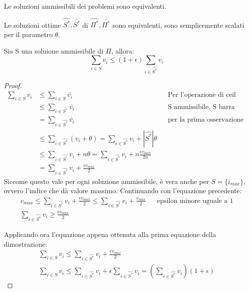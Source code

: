 \begin{remark}
    Le soluzioni ammissibili dei problemi sono equivalenti.
\end{remark}

\begin{lemma}
    Le soluzioni ottime $\hat{S^*}, \bar{S^*}$ di $\hat{\Pi^*}, \bar{\Pi^*}$ sono equivalenti, 
    sono semplicemente scalati per il parametro $\theta$.
\end{lemma}

\begin{lemma}
    \label{knl2}
    Sia S una soluione ammissibile di $\Pi$, allora:
    $$\sum_{i \in S} v_i \leq (1 + \epsilon) \sum_{i \in \hat{S^*}} v_i$$
\end{lemma}
\begin{proof}
    \begin{equation}
        \begin{aligned}
            \sum_{i \in S} v_i &\leq \sum_{i \in S} \bar{v_i} && \text{Per l'operazione di ceil}\\
            &\leq \sum_{i \in \bar{S^*}} \bar{v_i} && \text{S ammissibile, S barra ottima}\\
            &= \sum_{i \in \hat{S^*}} \bar{v_i} && \text{per la prima osservazione}\\
            &\leq \sum_{i \in \hat{S^*}} (v_i + \theta) = \sum_{i \in \hat{S^*}} v_i + |\hat{S^*}|\theta\\
            &\leq \sum_{i \in \hat{S^*}} v_i + n \theta = \sum_{i \in \hat{S^*}} v_i + n\frac{\epsilon v_{max}}{2n}\\
            &= \sum_{i \in \hat{S^*}} v_i + \frac{\epsilon v_{max}}{2} 
        \end{aligned}
    \end{equation}
    Siccome questo vale per ogni soluzione ammissibile, è vera anche per $S = \{i_{max}\}$, ovvero l'indice
    che dà valore massimo. Continuando con l'equazione precedente:
    \begin{equation}
        \begin{aligned}
            v_{max} \leq \sum_{i \in \hat{S^*}} v_i + \frac{\epsilon v_{max}}{2} \leq \sum_{i \in \hat{S^*}} v_i + \frac{ v_{max}}{2} &&\text{epsilon minore uguale a 1}\\
            \sum_{i \in \hat{S^*}} v_i \geq \frac{\epsilon v_{max}}{2}
        \end{aligned}
    \end{equation}

    Applicando ora l'equazione appena ottenuta alla prima equazione della dimostrazione:
    \begin{equation}
        \begin{aligned}
            \sum_{i \in S} v_i \leq \sum_{i \in \hat{S^*}} v_i + \frac{\epsilon v_{max}}{2}\\
            \sum_{i \in S} v_i \leq \sum_{i \in \hat{S^*}} v_i + \epsilon \sum_{i \in \hat{S^*}} v_i = (\sum_{i \in \hat{S^*}} v_i)(1+\epsilon)
        \end{aligned}
    \end{equation}
\end{proof}
